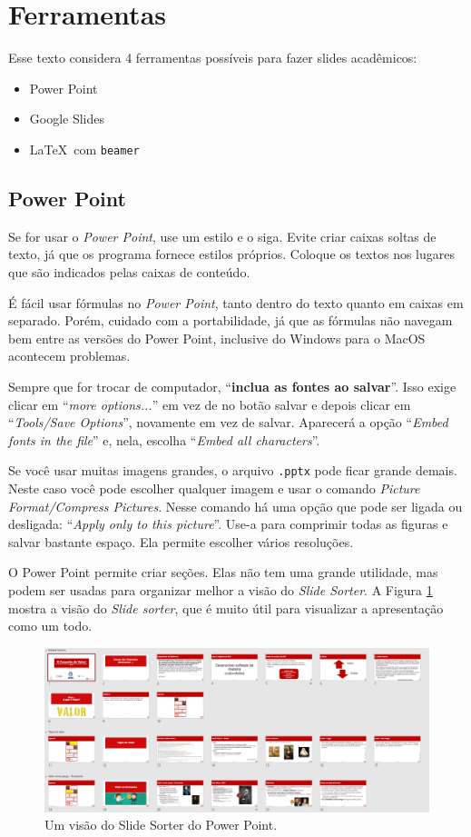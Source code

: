 \section{Ferramentas}

Esse texto considera 4 ferramentas possíveis para fazer slides acadêmicos:
\begin{itemize}
    \item Power Point
    \item Google Slides
    \item \LaTeX\  com \texttt{beamer}
\end{itemize}

\subsection{Power Point}

Se for usar o \textit{Power Point}, use um estilo e o siga. Evite criar caixas soltas de texto, já que os programa fornece estilos próprios. Coloque os textos nos lugares que são indicados pelas caixas de conteúdo.

É fácil usar fórmulas no \textit{Power Point}, tanto dentro do texto quanto em caixas em separado. Porém, cuidado com a portabilidade, já que as fórmulas não navegam bem entre as versões do Power Point, inclusive do Windows para o MacOS acontecem problemas.

Sempre que for trocar de computador, ``\textbf{inclua as fontes ao salvar}''. Isso exige clicar em ``\textit{more options...}'' em vez de no botão salvar e depois clicar em ``\textit{Tools/Save Options}'', novamente em vez de salvar. Aparecerá a opção ``\textit{Embed fonts in the file}'' e, nela, escolha ``\textit{Embed all characters}''.

Se você usar muitas imagens grandes, o arquivo \texttt{.pptx} pode ficar grande demais. Neste caso você pode escolher qualquer imagem e usar o comando \textit{Picture Format/Compress Pictures}. Nesse comando há uma opção que pode ser ligada ou desligada: ``\textit{Apply only to this picture}''. Use-a para comprimir todas as figuras e salvar bastante espaço. Ela permite escolher vários resoluções.

O Power Point permite criar seções. Elas não tem uma grande utilidade, mas podem ser usadas para organizar melhor a visão do \textit{Slide Sorter}. A Figura \ref{fig:sorter} mostra a visão do \textit{Slide sorter}, que é muito útil para visualizar a apresentação como um todo.

\begin{figure}[tbh]
    \centering
    \includegraphics[width=0.7\linewidth]{imagens/slidesorter}
    \caption{Um visão do Slide Sorter do Power Point.}
    \label{fig:sorter}
\end{figure}



